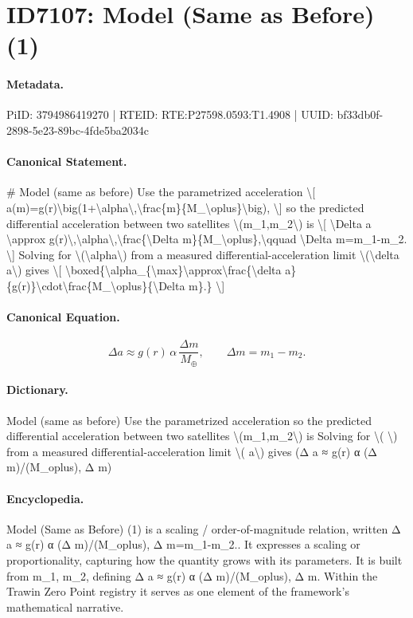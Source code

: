 \section*{ID7107: Model (Same as Before) (1)}
\paragraph{Metadata.}
PiID: 3794986419270 | RTEID: RTE:P27598.0593:T1.4908 | UUID: bf33db0f-2898-5e23-89bc-4fde5ba2034c

\paragraph{Canonical Statement.}
\# Model (same as before) Use the parametrized acceleration \textbackslash{}[ a(m)=g(r)\textbackslash{}big(1+\textbackslash{}alpha\textbackslash{},\textbackslash{}frac\{m\}\{M\_\textbackslash{}oplus\}\textbackslash{}big), \textbackslash{}] so the predicted differential acceleration between two satellites \textbackslash{}(m\_1,m\_2\textbackslash{}) is \textbackslash{}[ \textbackslash{}Delta a \textbackslash{}approx g(r)\textbackslash{},\textbackslash{}alpha\textbackslash{},\textbackslash{}frac\{\textbackslash{}Delta m\}\{M\_\textbackslash{}oplus\},\textbackslash{}qquad \textbackslash{}Delta m=m\_1-m\_2. \textbackslash{}] Solving for \textbackslash{}(\textbackslash{}alpha\textbackslash{}) from a measured differential-acceleration limit \textbackslash{}(\textbackslash{}delta a\textbackslash{}) gives \textbackslash{}[ \textbackslash{}boxed\{\textbackslash{}alpha\_\{\textbackslash{}max\}\textbackslash{}approx\textbackslash{}frac\{\textbackslash{}delta a\}\{g(r)\}\textbackslash{}cdot\textbackslash{}frac\{M\_\textbackslash{}oplus\}\{\textbackslash{}Delta m\}.\} \textbackslash{}]

\paragraph{Canonical Equation.}
\[
\Delta a \approx g(r)\,\alpha\,\frac{\Delta m}{M_\oplus},\qquad \Delta m=m_1-m_2.
\]

\paragraph{Dictionary.}
Model (same as before) Use the parametrized acceleration so the predicted differential acceleration between two satellites \textbackslash{}(m\_1,m\_2\textbackslash{}) is Solving for \textbackslash{}( \textbackslash{}) from a measured differential-acceleration limit \textbackslash{}( a\textbackslash{}) gives (Δ a ≈ g(r) α (Δ m)/(M\_oplus), Δ m)

\paragraph{Encyclopedia.}
Model (Same as Before) (1) is a scaling / order-of-magnitude relation, written Δ a ≈ g(r) α (Δ m)/(M\_oplus), Δ m=m\_1-m\_2.. It expresses a scaling or proportionality, capturing how the quantity grows with its parameters. It is built from m\_1, m\_2, defining Δ a ≈ g(r) α (Δ m)/(M\_oplus), Δ m. Within the Trawin Zero Point registry it serves as one element of the framework's mathematical narrative.
